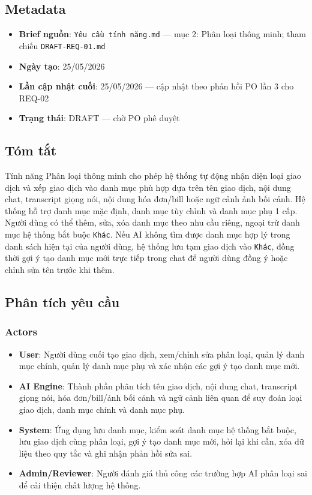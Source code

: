 


\subsection{Metadata}

\begin{itemize}
\item \textbf{Brief nguồn}: \texttt{Yêu cầu tính năng.md} — mục 2: Phân loại thông minh; tham chiếu \texttt{DRAFT-REQ-01.md}
\item \textbf{Ngày tạo}: 25/05/2026
\item \textbf{Lần cập nhật cuối}: 25/05/2026 — cập nhật theo phản hồi PO lần 3 cho REQ-02
\item \textbf{Trạng thái}: DRAFT — chờ PO phê duyệt
\end{itemize}
\subsection{Tóm tắt}

Tính năng Phân loại thông minh cho phép hệ thống tự động nhận diện loại giao dịch và xếp giao dịch vào danh mục phù hợp dựa trên tên giao dịch, nội dung chat, transcript giọng nói, nội dung hóa đơn/bill hoặc ngữ cảnh ảnh bối cảnh. Hệ thống hỗ trợ danh mục mặc định, danh mục tùy chỉnh và danh mục phụ 1 cấp. Người dùng có thể thêm, sửa, xóa danh mục theo nhu cầu riêng, ngoại trừ danh mục hệ thống bắt buộc \texttt{Khác}. Nếu AI không tìm được danh mục hợp lý trong danh sách hiện tại của người dùng, hệ thống lưu tạm giao dịch vào \texttt{Khác}, đồng thời gợi ý tạo danh mục mới trực tiếp trong chat để người dùng đồng ý hoặc chỉnh sửa tên trước khi thêm.



\subsection{Phân tích yêu cầu}



\subsubsection{Actors}

\begin{itemize}
\item \textbf{User}: Người dùng cuối tạo giao dịch, xem/chỉnh sửa phân loại, quản lý danh mục chính, quản lý danh mục phụ và xác nhận các gợi ý tạo danh mục mới.
\item \textbf{AI Engine}: Thành phần phân tích tên giao dịch, nội dung chat, transcript giọng nói, hóa đơn/bill/ảnh bối cảnh và ngữ cảnh liên quan để suy đoán loại giao dịch, danh mục chính và danh mục phụ.
\item \textbf{System}: Ứng dụng lưu danh mục, kiểm soát danh mục hệ thống bắt buộc, lưu giao dịch cùng phân loại, gợi ý tạo danh mục mới, hỏi lại khi cần, xóa dữ liệu theo quy tắc và ghi nhận phản hồi sửa sai.
\item \textbf{Admin/Reviewer}: Người đánh giá thủ công các trường hợp AI phân loại sai để cải thiện chất lượng hệ thống.
\end{itemize}
